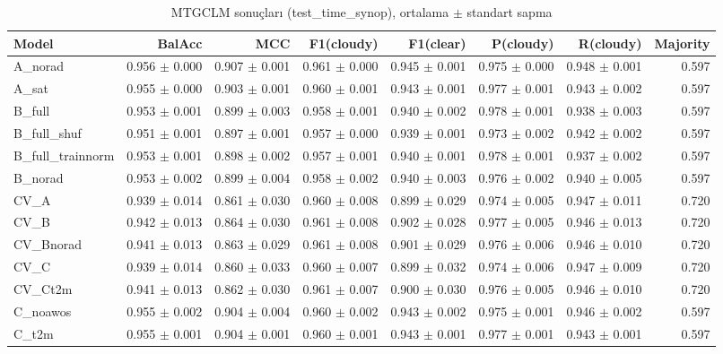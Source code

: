 \begin{table}[ht]
\centering
\caption{MTGCLM sonuçları (test_time_synop), ortalama $\pm$ standart sapma}
\label{tab:results_test_time_synop}
\begin{tabular}{lrrrrrrr}
\hline
Model & BalAcc & MCC & F1(cloudy) & F1(clear) & P(cloudy) & R(cloudy) & Majority \\
\hline
A\_norad & 0.956 $\pm$ 0.000 & 0.907 $\pm$ 0.001 & 0.961 $\pm$ 0.000 & 0.945 $\pm$ 0.001 & 0.975 $\pm$ 0.000 & 0.948 $\pm$ 0.001 & 0.597 \\
A\_sat & 0.955 $\pm$ 0.000 & 0.903 $\pm$ 0.001 & 0.960 $\pm$ 0.001 & 0.943 $\pm$ 0.001 & 0.977 $\pm$ 0.001 & 0.943 $\pm$ 0.002 & 0.597 \\
B\_full & 0.953 $\pm$ 0.001 & 0.899 $\pm$ 0.003 & 0.958 $\pm$ 0.001 & 0.940 $\pm$ 0.002 & 0.978 $\pm$ 0.001 & 0.938 $\pm$ 0.003 & 0.597 \\
B\_full\_shuf & 0.951 $\pm$ 0.001 & 0.897 $\pm$ 0.001 & 0.957 $\pm$ 0.000 & 0.939 $\pm$ 0.001 & 0.973 $\pm$ 0.002 & 0.942 $\pm$ 0.002 & 0.597 \\
B\_full\_trainnorm & 0.953 $\pm$ 0.001 & 0.898 $\pm$ 0.002 & 0.957 $\pm$ 0.001 & 0.940 $\pm$ 0.001 & 0.978 $\pm$ 0.001 & 0.937 $\pm$ 0.002 & 0.597 \\
B\_norad & 0.953 $\pm$ 0.002 & 0.899 $\pm$ 0.004 & 0.958 $\pm$ 0.002 & 0.940 $\pm$ 0.003 & 0.976 $\pm$ 0.002 & 0.940 $\pm$ 0.005 & 0.597 \\
CV\_A & 0.939 $\pm$ 0.014 & 0.861 $\pm$ 0.030 & 0.960 $\pm$ 0.008 & 0.899 $\pm$ 0.029 & 0.974 $\pm$ 0.005 & 0.947 $\pm$ 0.011 & 0.720 \\
CV\_B & 0.942 $\pm$ 0.013 & 0.864 $\pm$ 0.030 & 0.961 $\pm$ 0.008 & 0.902 $\pm$ 0.028 & 0.977 $\pm$ 0.005 & 0.946 $\pm$ 0.013 & 0.720 \\
CV\_Bnorad & 0.941 $\pm$ 0.013 & 0.863 $\pm$ 0.029 & 0.961 $\pm$ 0.008 & 0.901 $\pm$ 0.029 & 0.976 $\pm$ 0.006 & 0.946 $\pm$ 0.010 & 0.720 \\
CV\_C & 0.939 $\pm$ 0.014 & 0.860 $\pm$ 0.033 & 0.960 $\pm$ 0.007 & 0.899 $\pm$ 0.032 & 0.974 $\pm$ 0.006 & 0.947 $\pm$ 0.009 & 0.720 \\
CV\_Ct2m & 0.941 $\pm$ 0.013 & 0.862 $\pm$ 0.030 & 0.961 $\pm$ 0.007 & 0.900 $\pm$ 0.030 & 0.976 $\pm$ 0.005 & 0.946 $\pm$ 0.010 & 0.720 \\
C\_noawos & 0.955 $\pm$ 0.002 & 0.904 $\pm$ 0.004 & 0.960 $\pm$ 0.002 & 0.943 $\pm$ 0.002 & 0.975 $\pm$ 0.001 & 0.946 $\pm$ 0.002 & 0.597 \\
C\_t2m & 0.955 $\pm$ 0.001 & 0.904 $\pm$ 0.001 & 0.960 $\pm$ 0.001 & 0.943 $\pm$ 0.001 & 0.977 $\pm$ 0.001 & 0.943 $\pm$ 0.001 & 0.597 \\

\end{tabular}
\end{table}
